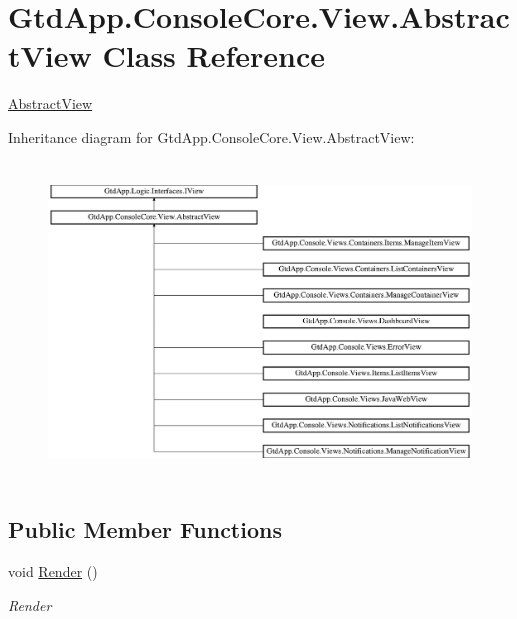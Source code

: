 \hypertarget{class_gtd_app_1_1_console_core_1_1_view_1_1_abstract_view}{}\section{Gtd\+App.\+Console\+Core.\+View.\+Abstract\+View Class Reference}
\label{class_gtd_app_1_1_console_core_1_1_view_1_1_abstract_view}


\mbox{\hyperlink{class_gtd_app_1_1_console_core_1_1_view_1_1_abstract_view}{Abstract\+View}}  


Inheritance diagram for Gtd\+App.\+Console\+Core.\+View.\+Abstract\+View\+:\begin{figure}[H]
\begin{center}
\leavevmode
\includegraphics[height=8.461538cm]{class_gtd_app_1_1_console_core_1_1_view_1_1_abstract_view}
\end{center}
\end{figure}
\subsection*{Public Member Functions}
\begin{DoxyCompactItemize}
\item 
void \mbox{\hyperlink{class_gtd_app_1_1_console_core_1_1_view_1_1_abstract_view_a1afdcb17203b5dc23d757c853a3d60bf}{Render}} ()
\begin{DoxyCompactList}\small\item\em Render \end{DoxyCompactList}\end{DoxyCompactItemize}
